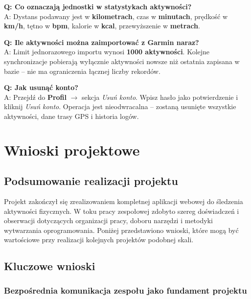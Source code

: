 \documentclass[12pt,a4paper]{report}
\begin{document}
\vspace{0.5em}
\textbf{Q: Co oznaczają jednostki w statystykach aktywności?} \\
A: Dystans podawany jest w \textbf{kilometrach}, czas w \textbf{minutach}, prędkość w \textbf{km/h}, tętno w \textbf{bpm}, kalorie w \textbf{kcal}, przewyższenie w \textbf{metrach}.

\vspace{0.5em}
\textbf{Q: Ile aktywności można zaimportować z Garmin naraz?} \\
A: Limit jednorazowego importu wynosi \textbf{1000 aktywności}. Kolejne synchronizacje pobierają wyłącznie aktywności nowsze niż ostatnia zapisana w bazie -- nie ma ograniczenia łącznej liczby rekordów.

\vspace{0.5em}
\textbf{Q: Jak usunąć konto?} \\
A: Przejdź do \textbf{Profil} $\to$ sekcja \textit{Usuń konto}. Wpisz hasło jako potwierdzenie i kliknij \textit{Usuń konto}. Operacja jest nieodwracalna -- zostaną usunięte wszystkie aktywności, dane trasy GPS i historia logów.

\chapter{Wnioski projektowe}
\label{ch:wnioski}

\section{Podsumowanie realizacji projektu}

Projekt zakończył się zrealizowaniem kompletnej aplikacji webowej do śledzenia aktywności fizycznych. W toku pracy zespołowej zdobyto szereg doświadczeń i obserwacji dotyczących organizacji pracy, doboru narzędzi i metodyki wytwarzania oprogramowania. Poniżej przedstawiono wnioski, które mogą być wartościowe przy realizacji kolejnych projektów podobnej skali.

\section{Kluczowe wnioski}

\subsection{Bezpośrednia komunikacja zespołu jako fundament projektu}
\end{document}
